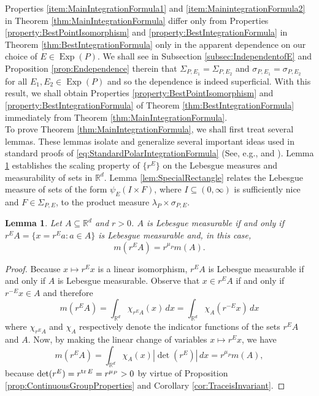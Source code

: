 \documentclass[11pt, letter]{book}
\newtheorem{lemma}[theorem]{Lemma}
\newcommand\Exp{\operatorname{Exp}}
\renewcommand\det{\operatorname{det}}
\begin{document}
\noindent Properties \ref{item:MainIntegrationFormula1} and \ref{item:MainintegrationFormula2} in Theorem \ref{thm:MainIntegrationFormula} differ only from Properties \ref{property:BestPointIsomorphism} and \ref{property:BestIntegrationFormula} in Theorem \ref{thm:BestIntegrationFormula} only in the apparent dependence on our choice of $E\in\Exp(P)$. We shall see in Subsection \ref{subsec:IndependentofE} and Proposition \ref{prop:Endependence} therein that $\Sigma_{P,E_1}=\Sigma_{P,E_2}$ and $\sigma_{P,E_1}=\sigma_{P,E_2}$ for all $E_1,E_2\in\Exp(P)$ and so the dependence is indeed superficial. With this result, we shall obtain Properties \ref{property:BestPointIsomorphism} and \ref{property:BestIntegrationFormula} of Theorem \ref{thm:BestIntegrationFormula} immediately from Theorem \ref{thm:MainIntegrationFormula}.\\

\noindent To prove Theorem \ref{thm:MainIntegrationFormula}, we shall first treat several lemmas. These lemmas isolate and generalize several important ideas used in standard proofs of \eqref{eq:StandardPolarIntegrationFormula} (See, e.g., \cite{folland_real_2013} and \cite{stein_real_2009}). Lemma \ref{lemma:Scaling} establishes the scaling property of $\{ r^E\}$ on the Lebesgue measures and measurability of sets in $\mathbb{R}^d$. Lemma \ref{lem:SpecialRectangle} relates the Lebesgue measure of sets of the form $\psi_E(I\times F)$, where $I\subseteq (0,\infty)$ is sufficiently nice and $F\in \Sigma_{P,E}$, to the product measure $\lambda_P \times \sigma_{P,E}$. 

\begin{framed}
\begin{lemma}\label{lemma:Scaling}
Let $A\subseteq\mathbb{R}^d$ and $r>0$.  $A$ is Lebesgue measurable if and only if $r^E A=\{x=r^E a:a\in A\}$ is Lebesgue measurable and, in this case,
\begin{equation*}
m(r^E A)=r^{\mu_P}m(A).
\end{equation*}
\end{lemma}
\end{framed}


\begin{proof}
Because $x\mapsto r^E x$ is a linear isomorphism, $r^E A$ is Lebesgue measurable if and only if $A$ is Lebesgue measurable. Observe that $x\in r^E A$ if and only if $r^{-E}x\in A$ and therefore
\begin{equation*}
m(r^E A)=\int_{\mathbb{R}^d}\chi_{r^E A}(x)\,dx=\int_{\mathbb{R}^d}\chi_{A}(r^{-E}x)\,dx
\end{equation*}
where $\chi_{r^EA}$ and $\chi_{A}$ respectively denote the indicator functions of the sets $r^EA$ and $A$. Now, by making the linear change of variables $x\mapsto r^E x$, we have
\begin{equation*}
m(r^E A)=\int_{\mathbb{R}^d}\chi_A(x)|\det(r^E)|\,dx=r^{\mu_P}m(A),
\end{equation*}
because $\det(r^E)=r^{\tr E}=r^{\mu_P}>0$ by virtue of Proposition \ref{prop:ContinuousGroupProperties} and Corollary \ref{cor:TraceisInvariant}.
\end{proof}
\end{document}
